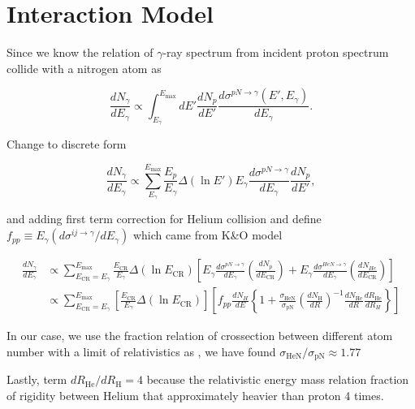 \chapter{Interaction Model}
\label{appendix:interaction_model}


Since we know the relation of $\gamma$-ray spectrum
from incident proton spectrum collide with a nitrogen atom as

\begin{equation}
    \frac{dN_\gamma}{dE_\gamma} \propto \int^{E_{\text{max}}}_{E_\gamma} dE'\frac{dN_p}{dE'} \frac{d\sigma^{pN\rightarrow\gamma}(E',E_\gamma)}{dE_\gamma}.
\end{equation}

Change to discrete form

\begin{equation}
    \frac{dN_\gamma}{dE_\gamma} \propto \sum_{E_\gamma}^{E_\text{max}} \frac{E_p}{E_\gamma}\Delta(\ln E')E_\gamma\frac{d\sigma^{pN\rightarrow\gamma}}{dE_\gamma}\frac{dN_p}{dE'},
\end{equation}

and adding first term correction for Helium
collision and define
$f_{pp}\equiv E_\gamma(d\sigma^{ij\rightarrow\gamma}/dE_\gamma)$
which came from K\&O model

\begin{equation}
\begin{split}
    \frac{dN_\gamma}{dE_\gamma} &\propto \sum_{E_\text{CR}=E_\gamma}^{E_\text{max}}\frac{E_\text{CR}}{E_\gamma}\Delta(\ln E_\text{CR})\left[ E_\gamma\frac{d\sigma^{pN\rightarrow\gamma}}{dE_\gamma}\left(\frac{dN_p}{dE_\text{CR}}\right) + E_\gamma\frac{d\sigma^{HeN\rightarrow\gamma}}{dE_\gamma}\left(\frac{dN_{He}}{dE_\text{CR}}\right) \right] \\
    &\propto \sum_{E_\text{CR}=E_\gamma}^{E_\text{max}} \left[ \frac{E_\text{CR}}{E_\gamma}\Delta(\ln E_\text{CR}) \right]\left[ f_{pp}\frac{dN_H}{dE} \left\{ 1+ \frac{\sigma_{\text{HeN}}}{\sigma_\text{pN}}\left(\frac{dN_\text{H}}{dR} \right)^{-1}\frac{dN_\text{He}}{dR}\frac{dR_\text{He}}{dR_H}\right\}\right]
\end{split}
\end{equation}

In our case, we use the fraction relation of
crossection between different atom number with
a limit of relativistics as \cite{WAtwater},
we have found $\sigma_{\text{HeN}}/\sigma_\text{pN} \approx 1.77$
\par Lastly, term $dR_\text{He}/dR_\text{H} = 4$
because the relativistic energy mass relation
fraction of rigidity between Helium that approximately
heavier than proton 4 times.